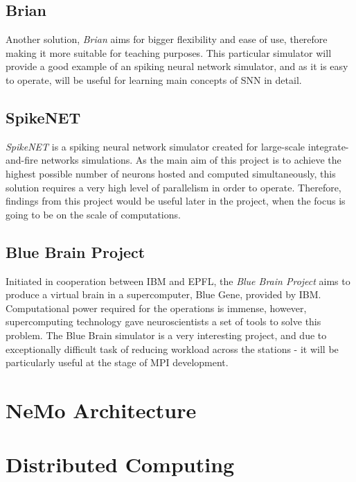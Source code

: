 \subsection{Brian}

Another solution, \emph{Brian} aims for bigger flexibility and ease of use, therefore making it more suitable for teaching purposes. \cite{Goodman2008} This
particular simulator will provide a good example of an spiking neural network simulator, and as it is easy to operate, will be useful for learning main concepts
of SNN in detail.

\subsection{SpikeNET}

\emph{SpikeNET} is a spiking neural network simulator created for large-scale integrate-and-fire networks simulations.\cite{ArnaudDelorme1999} As the main aim of this project is to
achieve the highest possible number of neurons hosted and computed simultaneously, this solution requires a very high level of parallelism in order to operate.
Therefore, findings from this project would be useful later in the project, when the focus is going to be on the scale of computations.

\subsection{Blue Brain Project}

Initiated in cooperation between IBM and EPFL, the \emph{Blue Brain Project} aims to produce a virtual brain in a supercomputer, Blue Gene, provided by IBM.\cite{BlueBrain} Computational power
required for the operations is immense, however, supercomputing technology gave neuroscientists a set of tools to solve this problem. The Blue Brain simulator is
a very interesting project, and due to exceptionally difficult task of reducing workload across the stations - it will be particularly useful at the stage of MPI development.

\section{NeMo Architecture}




\section{Distributed Computing}

